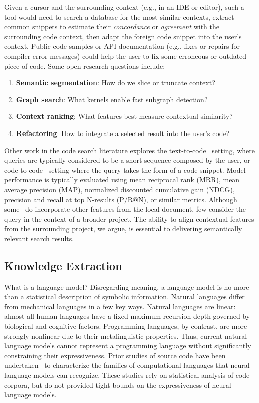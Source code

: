 \documentclass[12pt]{article}
\begin{document}
Given a cursor and the surrounding context (e.g., in an IDE or editor), such a tool would need to search a database for the most similar contexts, extract common snippets to estimate their \textit{concordance} or \textit{agreement} with the surrounding code context, then adapt the foreign code snippet into the user's context. Public code samples or API-documentation (e.g., fixes or repairs for compiler error messages) could help the user to fix some erroneous or outdated piece of code. Some open research questions include:

  \begin{enumerate}
    \item \textbf{Semantic segmentation}: How do we slice or truncate context?
    \item \textbf{Graph search}: What kernels enable fast subgraph detection?
    \item \textbf{Context ranking}: What features best measure contextual similarity?
    \item \textbf{Refactoring}: How to integrate a selected result into the user's code?
  \end{enumerate}


Other work in the code search literature explores the text-to-code~\cite{husain2019codesearchnet} setting, where queries are typically considered to be a short sequence composed by the user, or code-to-code~\cite{kim2018facoy} setting where the query takes the form of a code snippet. Model performance is typically evaluated using mean reciprocal rank (MRR), mean average precision (MAP), normalized discounted cumulative gain (NDCG), precision and recall at top N-results (P/R@N), or similar metrics. Although some~\cite{asyrofi2020ausearch} do incorporate other features from the local document, few consider the query in the context of a broader project. The ability to align contextual features from the surrounding project, we argue, is essential to delivering semantically relevant search results.

  \subsection{Knowledge Extraction}\label{subsec:knowledge-extraction}

What is a language model? Disregarding meaning, a language model is no more than a statistical description of symbolic information. Natural languages differ from mechanical languages in a few key ways. Natural languages are linear: almost all human languages have a fixed maximum recursion depth governed by biological and cognitive factors. Programming languages, by contrast, are more strongly nonlinear due to their metalinguistic properties. Thus, current natural language models cannot represent a programming language without significantly constraining their expressiveness. Prior studies of source code have been undertaken~\cite{weiss2018practical, chirkova2020empirical, chen2021evaluating} to characterize the families of computational languages that neural language models can recognize. These studies rely on statistical analysis of code corpora, but do not provided tight bounds on the expressiveness of neural language models.
\end{document}
